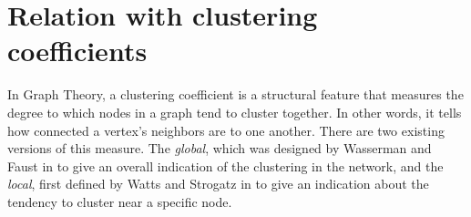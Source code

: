 \documentclass{article}
\newtheorem{definition}{Definition}
\newtheorem{lemma}{Lemma}
\newcommand{\len}{\textsf{len}}
\begin{document}







\section{Relation with clustering coefficients}

In Graph Theory, a clustering coefficient is a structural feature that measures the degree to which nodes in a graph tend to cluster together.
In other words, it tells how connected a vertex’s neighbors are to one another.
There are two existing versions of this measure.
The \emph{global}, which was designed by Wasserman and Faust in \cite{wasserman1994social} to give an overall indication of the clustering in the network, and the \emph{local}, first defined by Watts and Strogatz in \cite{watts1998collective} to give an indication about the tendency to cluster near a specific node.
\end{document}
